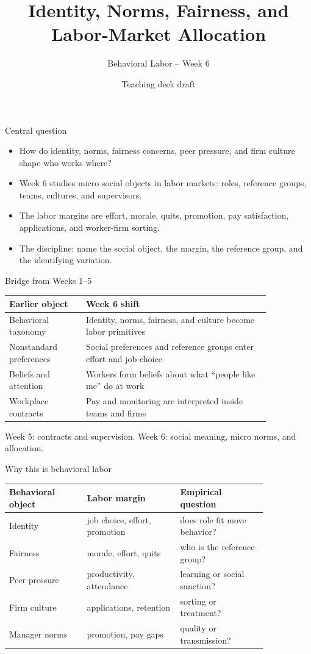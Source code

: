 \documentclass[aspectratio=169,11pt]{beamer}
\title{Identity, Norms, Fairness, and Labor-Market Allocation}
\subtitle{Behavioral Labor -- Week 6}
\author{Teaching deck draft}
\date{}
\begin{document}
\begin{frame}
  \titlepage
\end{frame}

\begin{frame}{Central question}
\begin{itemize}
    \item How do identity, norms, fairness concerns, peer pressure, and firm culture shape who works where?
    \item Week 6 studies micro social objects in labor markets: roles, reference groups, teams, cultures, and supervisors.
    \item The labor margins are effort, morale, quits, promotion, pay satisfaction, applications, and worker-firm sorting.
    \item The discipline: name the social object, the margin, the reference group, and the identifying variation.
\end{itemize}
\end{frame}

\begin{frame}{Bridge from Weeks 1--5}
\small
\begin{tabular}{p{0.25\linewidth} p{0.60\linewidth}}
\toprule
Earlier object & Week 6 shift \\
\midrule
Behavioral taxonomy & Identity, norms, fairness, and culture become labor primitives \\
Nonstandard preferences & Social preferences and reference groups enter effort and job choice \\
Beliefs and attention & Workers form beliefs about what ``people like me'' do at work \\
Workplace contracts & Pay and monitoring are interpreted inside teams and firms \\
\bottomrule
\end{tabular}

\vspace{0.7em}
Week 5: contracts and supervision. Week 6: social meaning, micro norms, and allocation.
\end{frame}

\begin{frame}{Why this is behavioral labor}
\small
\begin{tabular}{p{0.25\linewidth} p{0.30\linewidth} p{0.29\linewidth}}
\toprule
Behavioral object & Labor margin & Empirical question \\
\midrule
Identity & job choice, effort, promotion & does role fit move behavior? \\
Fairness & morale, effort, quits & who is the reference group? \\
Peer pressure & productivity, attendance & learning or social sanction? \\
Firm culture & applications, retention & sorting or treatment? \\
Manager norms & promotion, pay gaps & quality or transmission? \\
\bottomrule
\end{tabular}
\end{frame}
\end{document}
